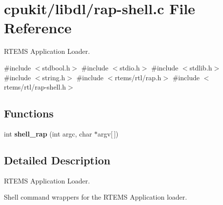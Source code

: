 \hypertarget{rap-shell_8c}{}\section{cpukit/libdl/rap-\/shell.c File Reference}
\label{rap-shell_8c}


R\+T\+E\+MS Application Loader.  


{\ttfamily \#include $<$stdbool.\+h$>$}\newline
{\ttfamily \#include $<$stdio.\+h$>$}\newline
{\ttfamily \#include $<$stdlib.\+h$>$}\newline
{\ttfamily \#include $<$string.\+h$>$}\newline
{\ttfamily \#include $<$rtems/rtl/rap.\+h$>$}\newline
{\ttfamily \#include $<$rtems/rtl/rap-\/shell.\+h$>$}\newline
\subsection*{Functions}
\begin{DoxyCompactItemize}
\item 
\mbox{\label{rap-shell_8c_a12863f9bb329ce63950032a8b65d9fb0}} 
int {\bfseries shell\+\_\+rap} (int argc, char $\ast$argv\mbox{[}$\,$\mbox{]})
\end{DoxyCompactItemize}


\subsection{Detailed Description}
R\+T\+E\+MS Application Loader. 

Shell command wrappers for the R\+T\+E\+MS Application loader. 